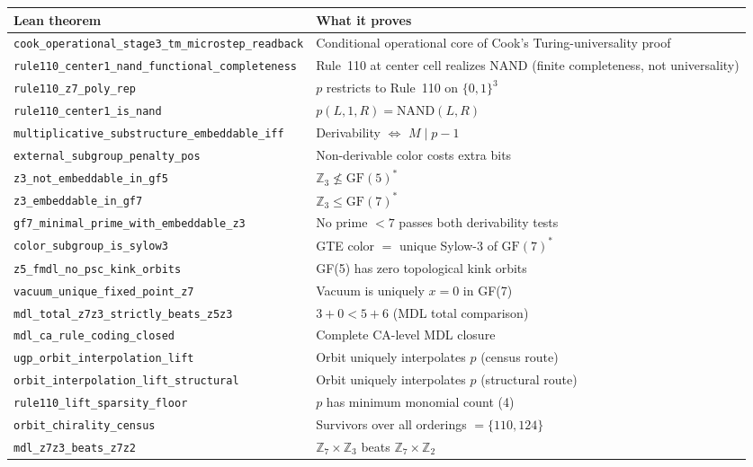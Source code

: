 \documentclass[11pt,a4paper]{article}
\newcommand{\lean}[1]{\texttt{#1}}
\theoremstyle{definition}
\begin{document}
\begin{center}
\small
\begin{tabular}{@{}p{7.6cm}p{3.0cm}@{}}
\toprule
\textbf{Lean theorem} & \textbf{What it proves} \\
\midrule
\lean{cook\_operational\_stage3\_tm\_microstep\_readback}
  & Conditional operational core of Cook's Turing-universality proof \\
\lean{rule110\_center1\_nand\_functional\_completeness}
  & Rule~110 at center cell realizes NAND (finite completeness, not universality) \\
\lean{rule110\_z7\_poly\_rep}
  & $p$ restricts to Rule~110 on $\{0,1\}^3$ \\
\lean{rule110\_center1\_is\_nand}
  & $p(L,1,R) = \mathrm{NAND}(L,R)$ \\
\lean{multiplicative\_substructure\_embeddable\_iff}
  & Derivability $\Leftrightarrow$ $M \mid p-1$ \\
\lean{external\_subgroup\_penalty\_pos}
  & Non-derivable color costs extra bits \\
\lean{z3\_not\_embeddable\_in\_gf5}
  & $\mathbb{Z}_3 \not\leq \mathrm{GF}(5)^*$ \\
\lean{z3\_embeddable\_in\_gf7}
  & $\mathbb{Z}_3 \leq \mathrm{GF}(7)^*$ \\
\lean{gf7\_minimal\_prime\_with\_embeddable\_z3}
  & No prime $< 7$ passes both derivability tests \\
\lean{color\_subgroup\_is\_sylow3}
  & GTE color $=$ unique Sylow-3 of $\mathrm{GF}(7)^*$ \\
\lean{z5\_fmdl\_no\_psc\_kink\_orbits}
  & GF(5) has zero topological kink orbits \\
\lean{vacuum\_unique\_fixed\_point\_z7}
  & Vacuum is uniquely $x = 0$ in GF(7) \\
\lean{mdl\_total\_z7z3\_strictly\_beats\_z5z3}
  & $3 + 0 < 5 + 6$ (MDL total comparison) \\
\lean{mdl\_ca\_rule\_coding\_closed}
  & Complete CA-level MDL closure \\
\lean{ugp\_orbit\_interpolation\_lift}
  & Orbit uniquely interpolates $p$ (census route) \\
\lean{orbit\_interpolation\_lift\_structural}
  & Orbit uniquely interpolates $p$ (structural route) \\
\lean{rule110\_lift\_sparsity\_floor}
  & $p$ has minimum monomial count (4) \\
\lean{orbit\_chirality\_census}
  & Survivors over all orderings $= \{110, 124\}$ \\
\lean{mdl\_z7z3\_beats\_z7z2}
  & $\mathbb{Z}_7\!\times\!\mathbb{Z}_3$ beats $\mathbb{Z}_7\!\times\!\mathbb{Z}_2$ \\
\bottomrule
\end{tabular}
\end{center}
\end{document}
